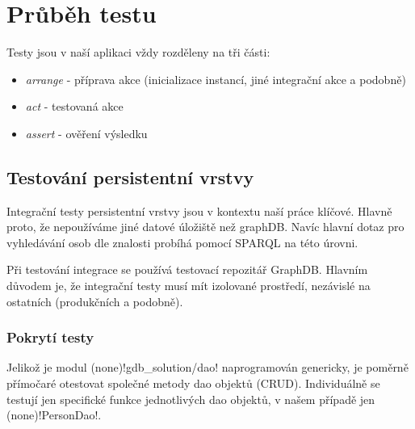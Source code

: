 \section{Průběh testu}
Testy jsou v naší aplikaci vždy rozděleny na tři části:
\begin{itemize}
    \item \textit{arrange} - příprava akce (inicializace instancí, jiné integrační akce a podobně)
    \item \textit{act} - testovaná akce
    \item \textit{assert} - ověření výsledku
\end{itemize}
\subsection{Testování persistentní vrstvy}
Integrační testy persistentní vrstvy jsou v kontextu naší práce klíčové. Hlavně proto, že nepoužíváme jiné datové úložiště než graphDB. Navíc hlavní dotaz pro vyhledávání osob dle znalosti probíhá pomocí SPARQL na této úrovni.\par
Při testování integrace se používá testovací repozitář GraphDB. Hlavním důvodem je, že integrační testy musí mít izolované prostředí, nezávislé na ostatních (produkčních a podobně).
\subsubsection{Pokrytí testy}
Jelikož je modul \ctulst(none)!gdb_solution/dao! naprogramován genericky, je poměrně přímočaré otestovat společné metody dao objektů (CRUD). Individuálně se testují jen specifické funkce jednotlivých dao objektů, v našem případě jen \ctulst(none)!PersonDao!.
